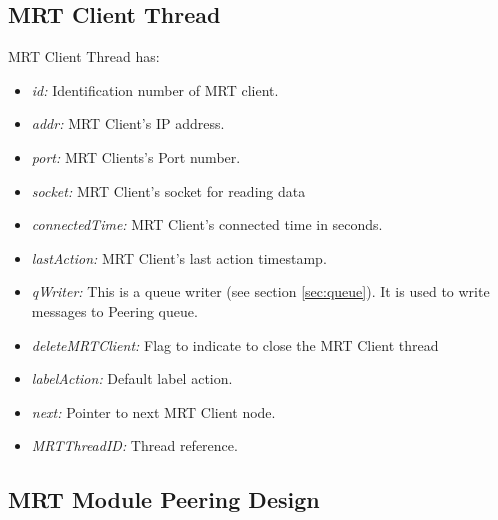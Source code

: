 \subsection{MRT Client Thread}
MRT Client Thread has:
\begin{itemize}
\item{\emph{id:} Identification number of MRT client. }
\item{\emph{addr:} MRT Client's IP address. }
\item{\emph{port:}  MRT Clients's Port number. }
\item{\emph{socket:} MRT Client's socket for reading data }
\item{\emph{connectedTime:} MRT Client's connected time in seconds. } 
\item{\emph{lastAction:} MRT Client's last action timestamp.}
\item{\emph{qWriter:} This is a queue writer (see section \ref{sec:queue}). It is used to write messages to Peering queue. }
\item{\emph{deleteMRTClient:} Flag to indicate to close the MRT Client thread}
\item{\emph{labelAction:} Default label action. }
\item{\emph{next:}  Pointer to next MRT Client node. }
\item{\emph{MRTThreadID:}  Thread reference. }
\end{itemize}

\subsection{MRT Module Peering Design}

